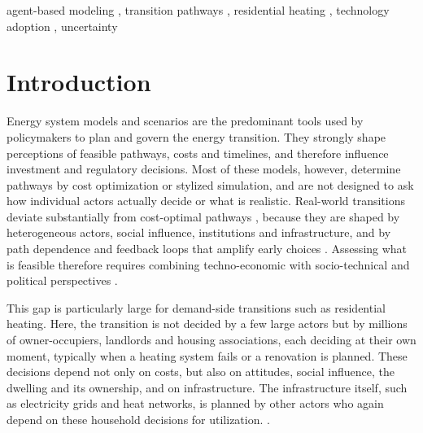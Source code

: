 \documentclass[preprint,12pt,authoryear]{elsarticle}
\def\sep{, }%
\begin{document}
\begin{frontmatter}
\begin{keyword}
agent-based modeling \sep transition pathways \sep residential heating
\sep technology adoption \sep uncertainty
\end{keyword}

\end{frontmatter}

\section{Introduction}
\label{sec:intro}
Energy system models and scenarios are the predominant tools used by
policymakers to plan and govern the energy transition. They strongly shape
perceptions of feasible pathways, costs and timelines, and therefore
influence investment and regulatory decisions. Most of these models, however,
determine pathways by cost optimization or stylized simulation, and are not
designed to ask how individual actors actually decide or what is realistic.
Real-world transitions deviate substantially from cost-optimal pathways
\citep{trutnevyteDoesCostOptimization2016}, because they are shaped by
heterogeneous actors, social influence, institutions and infrastructure, and
by path dependence and feedback loops that amplify early choices
\citep{barazzaKeyRoleHistoric2021,
mercureModellingInnovationMacroeconomics2019,
fouquetHistoricalEnergyTransitions2016}. Assessing what is feasible therefore
requires combining techno-economic with socio-technical and political
perspectives \citep{cherpIntegratingTechnoeconomicSociotechnical2018,
geelsBridgingAnalyticalApproaches2016}.

This gap is particularly large for demand-side transitions such as
residential heating. Here, the transition is not decided by a few large
actors but by millions of owner-occupiers, landlords and housing
associations, each deciding at their own moment, typically when a heating
system fails or a renovation is planned. These decisions depend not only on
costs, but also on attitudes, social influence, the dwelling and its
ownership, and on infrastructure. The infrastructure itself,
such as electricity grids and heat networks, is planned by other actors 
who again depend on these household decisions for utilization.
\citep{raoCriticalReviewHeat2025, hesselinkAdoptionEnergyEfficient2019}.
\end{document}
